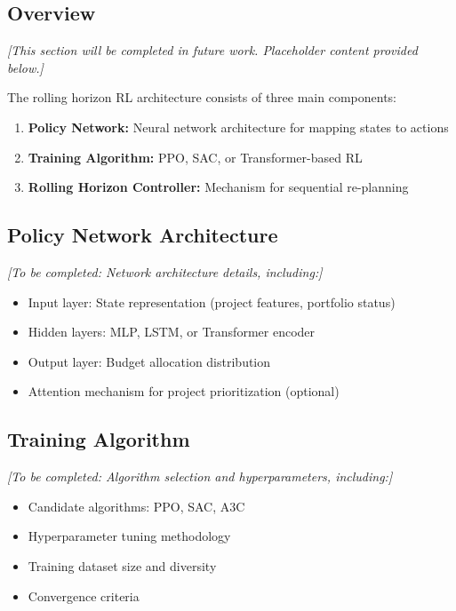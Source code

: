\subsection{Overview}

\textit{[This section will be completed in future work. Placeholder content provided below.]}

The rolling horizon RL architecture consists of three main components:

\begin{enumerate}
    \item \textbf{Policy Network:} Neural network architecture for mapping states to actions
    \item \textbf{Training Algorithm:} PPO, SAC, or Transformer-based RL
    \item \textbf{Rolling Horizon Controller:} Mechanism for sequential re-planning
\end{enumerate}

\subsection{Policy Network Architecture}

\textit{[To be completed: Network architecture details, including:]}
\begin{itemize}
    \item Input layer: State representation (project features, portfolio status)
    \item Hidden layers: MLP, LSTM, or Transformer encoder
    \item Output layer: Budget allocation distribution
    \item Attention mechanism for project prioritization (optional)
\end{itemize}

\subsection{Training Algorithm}

\textit{[To be completed: Algorithm selection and hyperparameters, including:]}
\begin{itemize}
    \item Candidate algorithms: PPO, SAC, A3C
    \item Hyperparameter tuning methodology
    \item Training dataset size and diversity
    \item Convergence criteria
\end{itemize}

